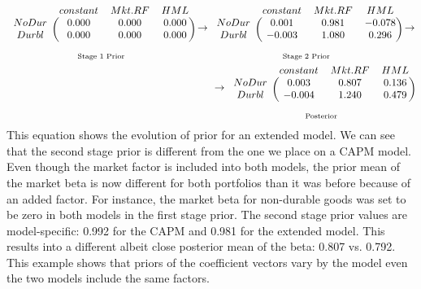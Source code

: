 \begin{eqnarray*}
\underset{\text{Stage 1 Prior}}
{\begin{blockarray}{cccc}
	& constant & Mkt.RF & HML \\ 
	\begin{block}{c(ccc )}
	NoDur & 0.000 & 0.000 & 0.000 \\ 
	Durbl & 0.000 & 0.000 & 0.000 \\ 
	\end{block}
\end{blockarray} }
\rightarrow
\underset{\text{Stage 2 Prior}}
{\begin{blockarray}{cccc}
	& constant & Mkt.RF & HML\\ 
	\begin{block}{c(ccc)}
NoDur & 0.001 & 0.981 & -0.078 \\ 
Durbl & -0.003 & 1.080 & 0.296 \\ 
	\end{block}
\end{blockarray} }
\rightarrow \\
\rightarrow
\underset{\text{Posterior}}
{\begin{blockarray}{cccc}
	& constant & Mkt.RF & HML \\ 
	\begin{block}{c(ccc)}
	NoDur & 0.003 & 0.807 & 0.136 \\ 
	Durbl & -0.004 & 1.240 & 0.479 \\ 
	\end{block}
\end{blockarray} }
\end{eqnarray*}
This equation shows the evolution of prior for an extended model. 
We can see that the second stage prior is different from the one we place on a CAPM model. 
Even though the market factor is included into both models, the prior mean of the market beta is now different for both portfolios than it was before because of an added factor.  
For instance, the market beta for non-durable goods was set to be zero in both models in the first stage prior.
The second stage prior values are model-specific: 0.992 for the CAPM and 0.981 for the extended model.
This results into a different albeit close posterior mean of the beta:  0.807 vs.  0.792.
This example shows that priors of the coefficient vectors vary by the model even the two models include the same factors.

